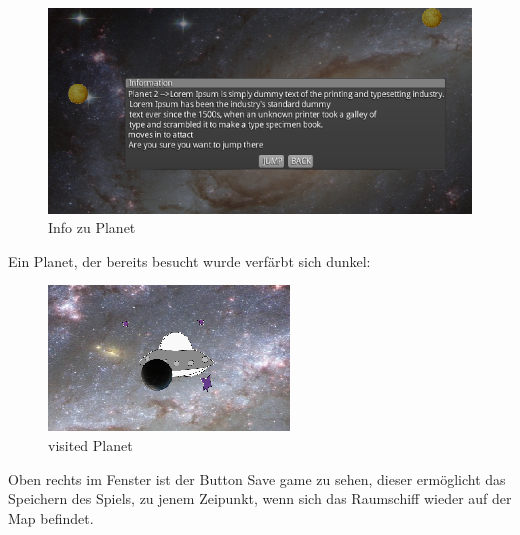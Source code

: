 \documentclass[fontsize=12pt,paper=a4,twoside]{scrartcl}
\begin{document}
\begin{figure}[htp]
	\centering
	\includegraphics[width=1.00\linewidth]{pics/infoPlanet2.png} %
	\caption{Info zu Planet}
	\label{fig1}
\end{figure}

Ein Planet, der bereits besucht wurde verfärbt sich dunkel:

\begin{figure}[htp]
	\centering
	\includegraphics[width=0.30\linewidth]{pics/visitedPlanet.png}
	\caption{visited Planet}
	\label{fig1}
\end{figure}

Oben rechts im Fenster ist der Button Save game zu sehen, dieser ermöglicht das Speichern des Spiels, zu jenem Zeipunkt, wenn sich das Raumschiff wieder auf der Map befindet.

\end{document}
